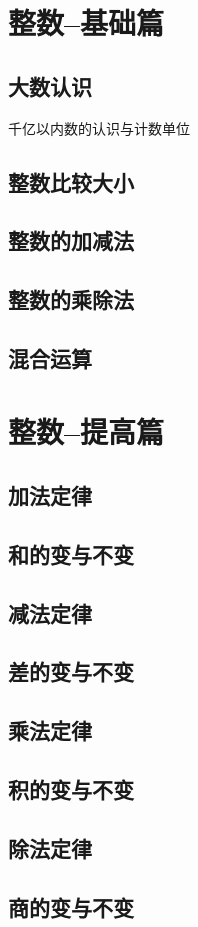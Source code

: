 \documentclass[../Main.tex]{subfiles}
\begin{document}
\chapter{整数--基础篇}

\section{大数认识}
千亿以内数的认识与计数单位
\section{整数比较大小}
\section{整数的加减法}
\section{整数的乘除法}
\section{混合运算}






\vspace{1em}










\let\cleardoublepage\clearpage

\chapter{整数--提高篇}

\section{加法定律}
\section{和的变与不变}

\section{减法定律}
\section{差的变与不变}

\section{乘法定律}
\section{积的变与不变}
\section{除法定律}
\section{商的变与不变}
\end{document}

